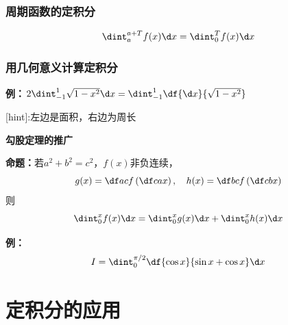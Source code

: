 \subsubsection{周期函数的定积分}

$$\dint_a^{a+T}f(x)\d x=\dint_0^{T}f(x)\d x$$

\subsubsection{用几何意义计算定积分}

{\bf 例：}$2\dint_{-1}^1\sqrt{1-x^2}\d x=
\dint_{-1}^1\df{\d x}{\sqrt{1-x^2}}$

[hint]:左边是面积，右边为周长

\begin{shaded}
	{\bf 勾股定理的推广}
	
	{\bf 命题：}若$a^2+b^2=c^2$，$f(x)$非负连续，
	$$g(x)=\df acf\left(\df cax\right),\quad 
	h(x)=\df bcf\left(\df cbx\right)$$
	则
	$$\dint_0^xf(x)\d x=\dint_0^xg(x)\d x+\dint_0^xh(x)\d x$$
	\begin{center}
	\end{center}
\end{shaded}

% 
	  
{\bf 例：}
$$I=\dint_0^{\pi/2}\df{\cos x}{\sin x+\cos x}\d x$$

\section{定积分的应用}

